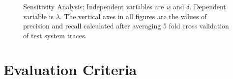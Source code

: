 \begin{figure}%
    \centering
    \qquad
    \caption{Sensitivity Analysis: Independent variables are \textit{w} and $\delta$. Dependent variable is $\lambda$. The vertical axes in all figures are the values of precision and recall calculated after averaging 5 fold cross validation of test system traces.}%
    \label{fig:sensitivityAnalysis_3}%
\end{figure}

\section{Evaluation Criteria}
\label{sec:metrics}

